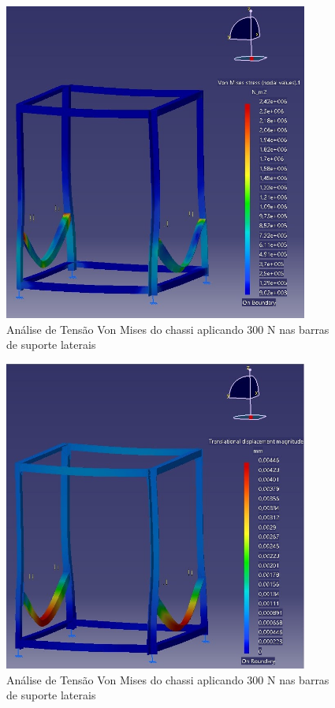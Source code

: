 \begin{figure}[H]
	\centering
	\includegraphics[width=10cm]{figuras/catia3.jpg}
	\caption{Análise de Tensão Von Mises do chassi aplicando 300 N nas barras de suporte laterais}
	\label{fig:catia3}
\end{figure}
\begin{figure}[H]
	\centering
	\includegraphics[width=10cm]{figuras/catia4.jpg}
	\caption{Análise de Tensão Von Mises do chassi aplicando 300 N nas barras de suporte laterais}
	\label{fig:catia4}
\end{figure}
